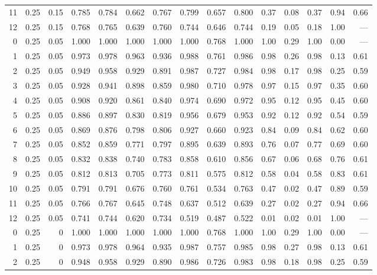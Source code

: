 \begin{landscape}
\begin{longtable}{rrrrrrrrrrrrrrr}
11 & 0.25 & 0.15 & 0.785 & 0.784 & 0.662 & 0.767 & 0.799 & 0.657 & 0.800 & 0.37 & 0.08 & 0.37 & 0.94 & 0.66 \\
12 & 0.25 & 0.15 & 0.768 & 0.765 & 0.639 & 0.760 & 0.744 & 0.646 & 0.744 & 0.19 & 0.05 & 0.18 & 1.00 & --- \\
\midrule
0 & 0.25 & 0.05 & 1.000 & 1.000 & 1.000 & 1.000 & 1.000 & 0.768 & 1.000 & 1.00 & 0.29 & 1.00 & 0.00 & --- \\
1 & 0.25 & 0.05 & 0.973 & 0.978 & 0.963 & 0.936 & 0.988 & 0.761 & 0.986 & 0.98 & 0.26 & 0.98 & 0.13 & 0.61 \\
2 & 0.25 & 0.05 & 0.949 & 0.958 & 0.929 & 0.891 & 0.987 & 0.727 & 0.984 & 0.98 & 0.17 & 0.98 & 0.25 & 0.59 \\
3 & 0.25 & 0.05 & 0.928 & 0.941 & 0.898 & 0.859 & 0.980 & 0.710 & 0.978 & 0.97 & 0.15 & 0.97 & 0.35 & 0.60 \\
4 & 0.25 & 0.05 & 0.908 & 0.920 & 0.861 & 0.840 & 0.974 & 0.690 & 0.972 & 0.95 & 0.12 & 0.95 & 0.45 & 0.60 \\
5 & 0.25 & 0.05 & 0.886 & 0.897 & 0.830 & 0.819 & 0.956 & 0.679 & 0.953 & 0.92 & 0.12 & 0.92 & 0.54 & 0.59 \\
6 & 0.25 & 0.05 & 0.869 & 0.876 & 0.798 & 0.806 & 0.927 & 0.660 & 0.923 & 0.84 & 0.09 & 0.84 & 0.62 & 0.60 \\
7 & 0.25 & 0.05 & 0.852 & 0.859 & 0.771 & 0.797 & 0.895 & 0.639 & 0.893 & 0.76 & 0.07 & 0.77 & 0.69 & 0.60 \\
8 & 0.25 & 0.05 & 0.832 & 0.838 & 0.740 & 0.783 & 0.858 & 0.610 & 0.856 & 0.67 & 0.06 & 0.68 & 0.76 & 0.61 \\
9 & 0.25 & 0.05 & 0.812 & 0.813 & 0.705 & 0.773 & 0.811 & 0.575 & 0.812 & 0.58 & 0.04 & 0.58 & 0.83 & 0.61 \\
10 & 0.25 & 0.05 & 0.791 & 0.791 & 0.676 & 0.760 & 0.761 & 0.534 & 0.763 & 0.47 & 0.02 & 0.47 & 0.89 & 0.59 \\
11 & 0.25 & 0.05 & 0.766 & 0.767 & 0.645 & 0.748 & 0.637 & 0.512 & 0.639 & 0.27 & 0.02 & 0.27 & 0.94 & 0.66 \\
12 & 0.25 & 0.05 & 0.741 & 0.744 & 0.620 & 0.734 & 0.519 & 0.487 & 0.522 & 0.01 & 0.02 & 0.01 & 1.00 & --- \\
\midrule
0 & 0.25 & 0 & 1.000 & 1.000 & 1.000 & 1.000 & 1.000 & 0.768 & 1.000 & 1.00 & 0.29 & 1.00 & 0.00 & --- \\
1 & 0.25 & 0 & 0.973 & 0.978 & 0.964 & 0.935 & 0.987 & 0.757 & 0.985 & 0.98 & 0.27 & 0.98 & 0.13 & 0.61 \\
2 & 0.25 & 0 & 0.948 & 0.958 & 0.929 & 0.890 & 0.986 & 0.726 & 0.983 & 0.98 & 0.18 & 0.98 & 0.25 & 0.59 \\

\end{longtable}
\end{landscape}
